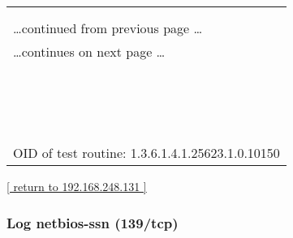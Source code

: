 \documentclass{article}
\begin{document}
\begin{longtable}{|p{}|}
\hline
\rowcolor{openvas_log}{\color{white}{Log (CVSS: 0.0) }}\\
\rowcolor{openvas_log}{\color{white}{NVT: Using NetBIOS to retrieve information from a Windows host}}\\
\hline
\endfirsthead
\hfill\ldots continued from previous page \ldots \\
\hline
\endhead
\hline
\ldots continues on next page \ldots \\
\endfoot
\hline
\endlastfoot
\\
\rowcolor{white}{\verb=The following 6 NetBIOS names have been gathered :=}\\
\rowcolor{white}{\verb= LH-0XZPOTYEAFVA =\verb-=-\verb= This is the computer name registered for workstation services=}\\
\rowcolor{white}{$\hookrightarrow$\verb= by a WINS client.=}\\
\rowcolor{white}{\verb= WORKGROUP       =\verb-=-\verb= Workgroup / Domain name=}\\
\rowcolor{white}{\verb= LH-0XZPOTYEAFVA =\verb-=-\verb= Computer name=}\\
\rowcolor{white}{\verb= WORKGROUP       =\verb-=-\verb= Workgroup / Domain name (part of the Browser elections)=}\\
\rowcolor{white}{\verb= WORKGROUP      =}\\
\rowcolor{white}{\verb=   __MSBROWSE__ =}\\
\rowcolor{white}{\verb=The remote host has the following MAC address on its adapter :=}\\
\rowcolor{white}{\verb=   00:0c:29:12:ba:de=}\\
\rowcolor{white}{\verb=If you do not want to allow everyone to find the NetBios name=}\\
\rowcolor{white}{\verb=of your computer, you should filter incoming traffic to this port.=}\\
\rowcolor{white}{\verb==}\\
\rowcolor{white}{\verb==}\\
\\
OID of test routine: 1.3.6.1.4.1.25623.1.0.10150\\
\end{longtable}

\begin{footnotesize}\hyperref[host:192.168.248.131]{[ return to 192.168.248.131 ]}\end{footnotesize}
\subsubsection{Log netbios-ssn (139/tcp)}
\label{port:192.168.248.131 netbios-ssn (139/tcp) Log}
\end{document}
